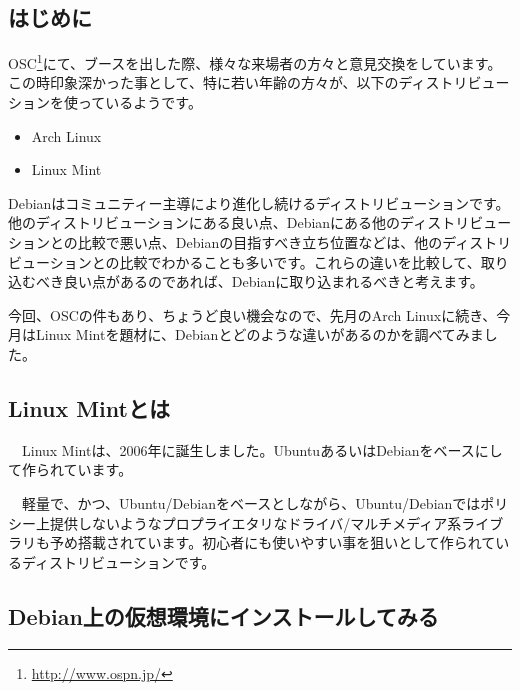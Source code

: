 \documentclass[mingoth,a4paper]{jsarticle}
\begin{document}


\subsection{はじめに}

 OSC\footnote{\url{http://www.ospn.jp/}}にて、ブースを出した際、様々な来場者の方々と意見交換をしています。この時印象深かった事として、特に若い年齢の方々が、以下のディストリビューションを使っているようです。

 \begin{itemize}
 \item Arch Linux
 \item Linux Mint
 \end{itemize}
 
 Debianはコミュニティー主導により進化し続けるディストリビューションです。他のディストリビューションにある良い点、Debianにある他のディストリビューションとの比較で悪い点、Debianの目指すべき立ち位置などは、他のディストリビューションとの比較でわかることも多いです。これらの違いを比較して、取り込むべき良い点があるのであれば、Debianに取り込まれるべきと考えます。

 今回、OSCの件もあり、ちょうど良い機会なので、先月のArch Linuxに続き、今月はLinux Mintを題材に、Debianとどのような違いがあるのかを調べてみました。

\subsection{Linux Mintとは}

　Linux Mintは、2006年に誕生しました\cite{ref:linuxmint-history}。UbuntuあるいはDebianをベースにして作られています。

　軽量で、かつ、Ubuntu/Debianをベースとしながら、Ubuntu/Debianではポリシー上提供しないようなプロプライエタリなドライバ/マルチメディア系ライブラリも予め搭載されています。初心者にも使いやすい事を狙いとして作られているディストリビューションです。

\subsection{Debian上の仮想環境にインストールしてみる}
\end{document}
